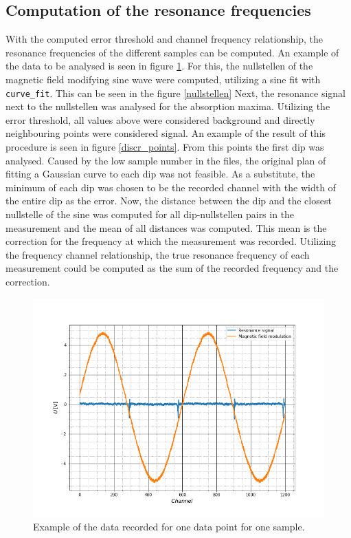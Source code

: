 \FloatBarrier
\subsection{Computation of the resonance frequencies}
With the computed error threshold and channel frequency relationship, the resonance frequencies of the different samples can be computed. An example of the data to be analysed is seen in figure \ref{data_raw}. 
For this, the nullstellen of the magnetic field modifying sine wave were computed, utilizing a sine fit with \verb|curve_fit|. This can be seen in the figure \ref{nullstellen} Next, the resonance signal next to the nullstellen was analysed for the absorption maxima. Utilizing the error threshold, all values above were considered background and directly neighbouring points were considered signal. An example of the result of this procedure is seen in figure \ref{discr_points}. From this points the first dip was analysed. Caused by the low sample number in the files, the original plan of fitting a Gaussian curve to each dip was not feasible. As a substitute, the minimum of each dip was chosen to be the recorded channel with the width of the entire dip as the error.
Now, the distance between the dip and the closest nullstelle of the sine was computed for all dip-nullstellen pairs in the measurement and the mean of all distances was computed. This mean is the correction  for the frequency at which the measurement was recorded. Utilizing the frequency channel relationship, the true resonance frequency of each measurement could be computed as the sum of the recorded frequency and the correction.

\begin{figure}[h]
	\includegraphics[scale=0.5]{Bild/raw_data}
	\centering
	\caption[Plot of the raw data]{Example of the data recorded for one data point for one sample.}
	\label{data_raw}
\end{figure}

